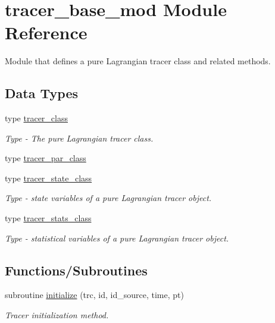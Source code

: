 \hypertarget{namespacetracer__base__mod}{}\section{tracer\+\_\+base\+\_\+mod Module Reference}
\label{namespacetracer__base__mod}


Module that defines a pure Lagrangian tracer class and related methods.  


\subsection*{Data Types}
\begin{DoxyCompactItemize}
\item 
type \mbox{\hyperlink{structtracer__base__mod_1_1tracer__class}{tracer\+\_\+class}}
\begin{DoxyCompactList}\small\item\em Type -\/ The pure Lagrangian tracer class. \end{DoxyCompactList}\item 
type \mbox{\hyperlink{structtracer__base__mod_1_1tracer__par__class}{tracer\+\_\+par\+\_\+class}}
\item 
type \mbox{\hyperlink{structtracer__base__mod_1_1tracer__state__class}{tracer\+\_\+state\+\_\+class}}
\begin{DoxyCompactList}\small\item\em Type -\/ state variables of a pure Lagrangian tracer object. \end{DoxyCompactList}\item 
type \mbox{\hyperlink{structtracer__base__mod_1_1tracer__stats__class}{tracer\+\_\+stats\+\_\+class}}
\begin{DoxyCompactList}\small\item\em Type -\/ statistical variables of a pure Lagrangian tracer object. \end{DoxyCompactList}\end{DoxyCompactItemize}
\subsection*{Functions/\+Subroutines}
\begin{DoxyCompactItemize}
\item 
subroutine \mbox{\hyperlink{namespacetracer__base__mod_ae73e3d1fd8818cf3e1a8593aafebea43}{initialize}} (trc, id, id\+\_\+source, time, pt)
\begin{DoxyCompactList}\small\item\em Tracer initialization method. \end{DoxyCompactList}\end{DoxyCompactItemize}
